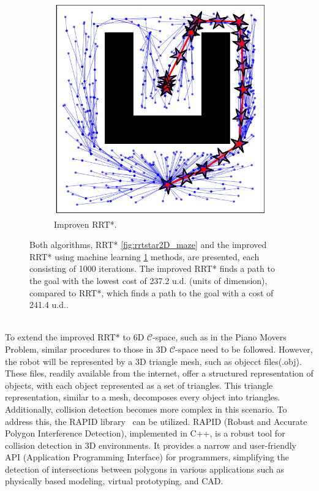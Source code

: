 \documentclass{ctuthesis}
\begin{document}
\begin{figure}[!ht]
\begin{subfigure}[b]{0.45\textwidth}
      \includegraphics[width=\textwidth]{figChap4/RRTstar2DML_maze237.2.pdf}
      \caption{Improven RRT*.}
      \label{fig:rrtstarML2D_maze}
  \end{subfigure}
  \caption{Both algorithms, 
  RRT* \ref{fig:rrtstar2D_maze} and the improved RRT* using 
  machine learning \ref{fig:rrtstarML2D_maze} methods, 
  are presented, each consisting of 1000 iterations. 
  The improved RRT* finds a path to the goal with 
  the lowest cost of 237.2 u.d. (units of dimension), compared to RRT*, 
  which finds a path to the goal with a cost of 241.4 u.d..}
  \label{fig:RRTstar2D_vs_RRTstarML2D}
\end{figure}
\\[12pt]
To extend the improved RRT* to 6D $\mathcal{C}$-space, 
such as in the Piano Movers Problem, similar procedures to those in 3D $\mathcal{C}$-space 
need to be followed. 
However, the robot will be represented by a 3D triangle mesh, such as objecct files(.obj). 
These files, readily available from the internet, 
offer a structured representation of objects, 
with each object represented as a set of triangles. 
This triangle representation, similar to a mesh, 
decomposes every object into triangles. 
Additionally, collision detection becomes more complex in this scenario. 
To address this, the RAPID library~\cite{gottschalk1997rapid} can be utilized. 
RAPID (Robust and Accurate Polygon Interference Detection), implemented in C++, 
is a robust tool for collision detection in 3D environments. 
It provides a narrow and user-friendly API (Application Programming Interface) for programmers, 
simplifying the detection of intersections between polygons in various applications such as 
physically based modeling, virtual prototyping, and CAD.  
\end{document}
